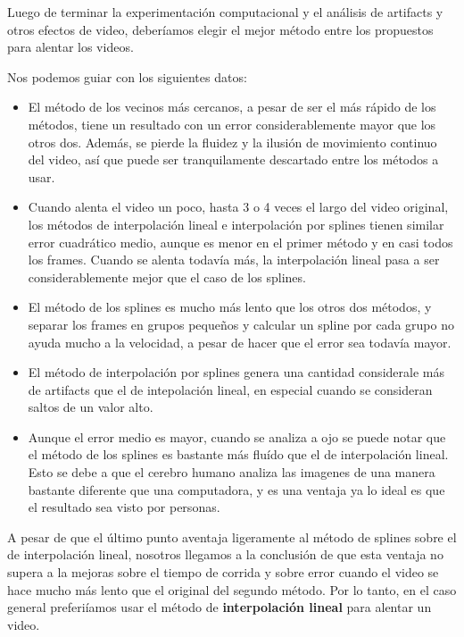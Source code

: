 Luego de terminar la experimentaci\'on computacional y el an\'alisis de artifacts y otros efectos de video, deber\'iamos elegir el mejor m\'etodo entre los propuestos para alentar los videos.

Nos podemos guiar con los siguientes datos:

\begin{itemize}
	\item El m\'etodo de los vecinos m\'as cercanos, a pesar de ser el m\'as r\'apido de los m\'etodos, tiene un resultado con un error considerablemente mayor que los otros dos. Adem\'as, se pierde la fluidez y la ilusi\'on de movimiento continuo del video, as\'i que puede ser tranquilamente descartado entre los m\'etodos a usar.
	\item Cuando alenta el video un poco, hasta 3 o 4 veces el largo del video original, los m\'etodos de interpolaci\'on lineal e interpolaci\'on por splines tienen similar error cuadr\'atico medio, aunque es menor en el primer m\'etodo y en casi todos los frames. Cuando se alenta todav\'ia m\'as, la interpolaci\'on lineal pasa a ser considerablemente mejor que el caso de los splines.
	\item El m\'etodo de los splines es mucho m\'as lento que los otros dos m\'etodos, y separar los frames en grupos peque\~nos y calcular un spline por cada grupo no ayuda mucho a la velocidad, a pesar de hacer que el error sea todav\'ia mayor.
	\item El m\'etodo de interpolaci\'on por splines genera una cantidad considerale m\'as de artifacts que el de intepolaci\'on lineal, en especial cuando se consideran saltos de un valor alto.
	\item Aunque el error medio es mayor, cuando se analiza a ojo se puede notar que el m\'etodo de los splines es bastante m\'as flu\'ido que el de interpolaci\'on lineal. Esto se debe a que el cerebro humano analiza las imagenes de una manera bastante diferente que una computadora, y es una ventaja ya lo ideal es que el resultado sea visto por personas.
\end{itemize}

A pesar de que el \'ultimo punto aventaja ligeramente al m\'etodo de splines sobre el de interpolaci\'on lineal, nosotros llegamos a la conclusi\'on de que esta ventaja no supera a la mejoras sobre el tiempo de corrida y sobre error cuando el video se hace mucho m\'as lento que el original del segundo m\'etodo. Por lo tanto, en el caso general preferi\'iamos usar el m\'etodo de \textbf{interpolaci\'on lineal} para alentar un video.
